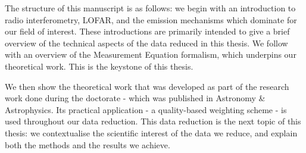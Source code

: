 %

\pg
The structure of this manuscript is as follows: we begin with an introduction to radio interferometry, LOFAR, and the emission mechanisms which dominate for our field of interest. These introductions are primarily intended to give a brief overview of the technical aspects of the data reduced in this thesis. We follow with an overview of the Measurement Equation formalism, which underpins our theoretical work. This is the keystone of this thesis.

\pg
We then show the theoretical work that was developed as part of the research work done during the doctorate - which was published in Astronomy \& Astrophysics. Its practical application - a quality-based weighting scheme - is used throughout our data reduction. This data reduction is the next topic of this thesis: we contextualise the scientific interest of the data we reduce, and explain both the methods and the results we achieve. 

